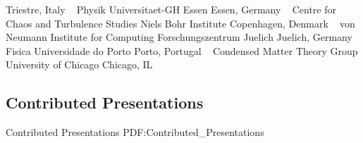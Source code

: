 Triestre, Italy
\newline
~
\Gap
{}
Physik
\newline
    Universitaet-GH Essen
    \newline
Essen, Germany
\newline
~
\Gap
{}
Centre for Chaos and Turbulence Studies
\newline
    Niels Bohr Institute
    \newline
Copenhagen, Denmark
\newline
~
\Gap
{}
von Neumann Institute for Computing
\newline
    Forschungszentrum Juelich
    \newline
Juelich, Germany
\newline
~
\Gap
{}
Fisica
\newline
    Universidade do Porto
    \newline
Porto, Portugal
\newline
~
\Gap
{}
Condensed Matter Theory Group
\newline
    University of Chicago
    \newline
Chicago, IL
\newline
~
\Gap
\vspace*{0.2cm}\subsection
{Contributed Presentations}
{Contributed Presentations}
{PDF:Contributed_Presentations}

